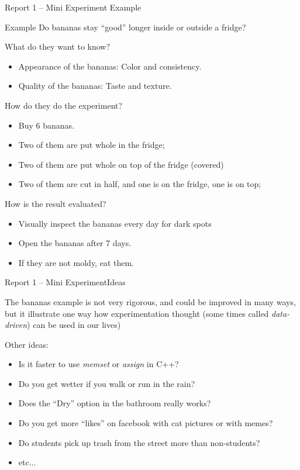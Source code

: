 \documentclass[t]{beamer}
\begin{document}
\begin{ftst}
  {Report 1 -- Mini Experiment}
  {Example}

    \begin{block}{Example}
      Do bananas stay ``good'' longer inside or outside a fridge?
  \end{block}

    What do they want to know?
    
    \begin{itemize}
    \item Appearance of the bananas: Color and consistency.
    \item Quality of the bananas: Taste and texture.
    \end{itemize}

    How do they do the experiment?
    \begin{itemize}
    \item Buy 6 bananas.
    \item Two of them are put whole in the fridge;
    \item Two of them are put whole on top of the fridge (covered)
    \item Two of them are cut in half, and one is on the fridge, one
      is on top;
    \end{itemize}

    How is the result evaluated?
    \begin{itemize}
    \item Visually inspect the bananas every day for dark spots
    \item Open the bananas after 7 days.
    \item If they are not moldy, eat them.
    \end{itemize}
\end{ftst}

\begin{ftst}
  {Report 1 -- Mini Experiment}{Ideas}
  \begin{block}{}
    The bananas example is not very rigorous, and could be improved in
    many ways, but it illustrate one way how experimentation thought
    (some times called \emph{data-driven}) can be used in our lives)
  \end{block}

  \vone
  
  Other ideas:
  \begin{itemize}
  \item Is it faster to use \emph{memset} or \emph{assign} in C++?
  \item Do you get wetter if you walk or run in the rain?
  \item Does the ``Dry'' option in the bathroom really works?
  \item Do you get more ``likes'' on facebook with cat pictures or
    with memes?
  \item Do students pick up trash from the street more than
    non-students?
  \item etc...
  \end{itemize}
\end{ftst}
\end{document}
